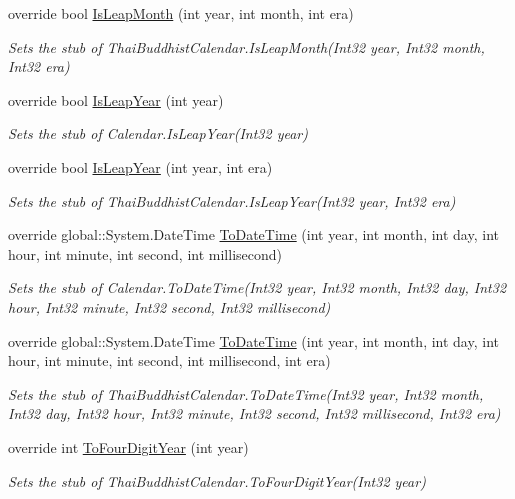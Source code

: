 \begin{DoxyCompactItemize}
override bool \hyperlink{class_system_1_1_globalization_1_1_fakes_1_1_stub_thai_buddhist_calendar_a8a36f17a01a9975f3f4389f8ca2cf967}{Is\-Leap\-Month} (int year, int month, int era)
\begin{DoxyCompactList}\small\item\em Sets the stub of Thai\-Buddhist\-Calendar.\-Is\-Leap\-Month(\-Int32 year, Int32 month, Int32 era)\end{DoxyCompactList}\item 
override bool \hyperlink{class_system_1_1_globalization_1_1_fakes_1_1_stub_thai_buddhist_calendar_a8b3357d3e729b7527a4faa56aab7d36d}{Is\-Leap\-Year} (int year)
\begin{DoxyCompactList}\small\item\em Sets the stub of Calendar.\-Is\-Leap\-Year(\-Int32 year)\end{DoxyCompactList}\item 
override bool \hyperlink{class_system_1_1_globalization_1_1_fakes_1_1_stub_thai_buddhist_calendar_a77023d2ed3096cee7a56fed7a4a2684d}{Is\-Leap\-Year} (int year, int era)
\begin{DoxyCompactList}\small\item\em Sets the stub of Thai\-Buddhist\-Calendar.\-Is\-Leap\-Year(\-Int32 year, Int32 era)\end{DoxyCompactList}\item 
override global\-::\-System.\-Date\-Time \hyperlink{class_system_1_1_globalization_1_1_fakes_1_1_stub_thai_buddhist_calendar_a481c6cff8c803cb35436205f6d2208f0}{To\-Date\-Time} (int year, int month, int day, int hour, int minute, int second, int millisecond)
\begin{DoxyCompactList}\small\item\em Sets the stub of Calendar.\-To\-Date\-Time(\-Int32 year, Int32 month, Int32 day, Int32 hour, Int32 minute, Int32 second, Int32 millisecond)\end{DoxyCompactList}\item 
override global\-::\-System.\-Date\-Time \hyperlink{class_system_1_1_globalization_1_1_fakes_1_1_stub_thai_buddhist_calendar_abc37cec8e373eb7f75ad1bf3157c503c}{To\-Date\-Time} (int year, int month, int day, int hour, int minute, int second, int millisecond, int era)
\begin{DoxyCompactList}\small\item\em Sets the stub of Thai\-Buddhist\-Calendar.\-To\-Date\-Time(\-Int32 year, Int32 month, Int32 day, Int32 hour, Int32 minute, Int32 second, Int32 millisecond, Int32 era)\end{DoxyCompactList}\item 
override int \hyperlink{class_system_1_1_globalization_1_1_fakes_1_1_stub_thai_buddhist_calendar_acb9e0181a06178629ba40a83c980d3ac}{To\-Four\-Digit\-Year} (int year)
\begin{DoxyCompactList}\small\item\em Sets the stub of Thai\-Buddhist\-Calendar.\-To\-Four\-Digit\-Year(\-Int32 year)\end{DoxyCompactList}\end{DoxyCompactItemize}
